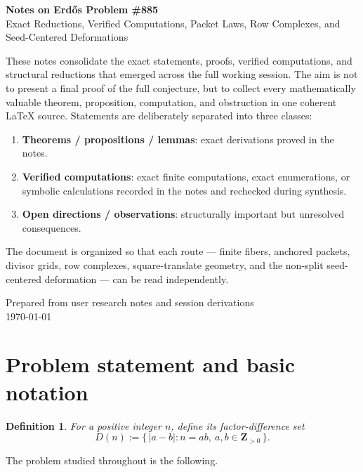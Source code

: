 \documentclass[11pt]{article}
\theoremstyle{plainbreak}
\theoremstyle{defbreak}
\newtheorem{definition}[theorem]{Definition}
\newcommand{\Dset}{D}
\newcommand{\Z}{\mathbf{Z}}
\begin{document}
\begin{titlepage}
\centering
{\Large \textbf{Notes on Erd\H{o}s Problem \#885}}\\[1.25em]
{\large Exact Reductions, Verified Computations, Packet Laws, Row Complexes, and Seed-Centered Deformations}\\[2em]
\begin{minipage}{0.88\textwidth}
\small
These notes consolidate the exact statements, proofs, verified computations, and structural reductions that emerged across the full working session.  The aim is not to present a final proof of the full conjecture, but to collect every mathematically valuable theorem, proposition, computation, and obstruction in one coherent \LaTeX{} source.  Statements are deliberately separated into three classes:
\begin{enumerate}[label=\textbf{(\arabic*)},itemsep=0.4em]
    \item \textbf{Theorems / propositions / lemmas}: exact derivations proved in the notes.
    \item \textbf{Verified computations}: exact finite computations, exact enumerations, or symbolic calculations recorded in the notes and rechecked during synthesis.
    \item \textbf{Open directions / observations}: structurally important but unresolved consequences.
\end{enumerate}
The document is organized so that each route --- finite fibers, anchored packets, divisor grids, row complexes, square-translate geometry, and the non-split seed-centered deformation --- can be read independently.
\end{minipage}
\vfill
{\large Prepared from user research notes and session derivations}\\[0.5em]
{\large \today}
\end{titlepage}

\tableofcontents
\bigskip

\section{Problem statement and basic notation}

\begin{definition}
For a positive integer $n$, define its \emph{factor-difference set}
\[
\Dset(n):=\{\,|a-b| : n=ab,\ a,b\in\Z_{>0}\,\}.
\]
\end{definition}

The problem studied throughout is the following.
\end{document}
